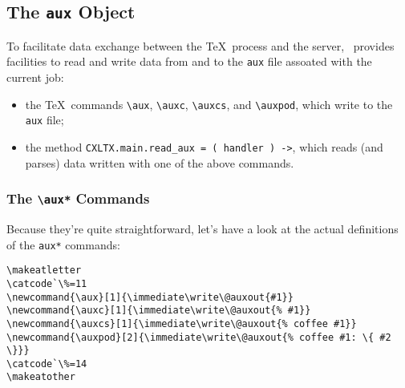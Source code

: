 






\subsection{The \texttt{aux} Object}\label{aux}

To facilitate data exchange between the \TeX\ process and the server, \CXLTX\ provides facilities
to read and write data from and to the \verb#aux# file assoated with the current job:

\begin{itemize}
\item
  the \TeX\ commands \verb#\aux#, \verb#\auxc#, \verb#\auxcs#, and \verb#\auxpod#, which write to the
  \verb#aux# file;
\item
  the method \verb#CXLTX.main.read_aux = ( handler ) ->#, which reads (and parses) data written with one of
  the above commands.
\end{itemize}

\subsubsection{The \texttt{\textbackslash{}aux*} Commands}\label{aux}

Because they're quite straightforward, let's have a look at the actual definitions of the
\verb#aux*# commands:

\begin{verbatim}
\makeatletter
\catcode`\%=11
\newcommand{\aux}[1]{\immediate\write\@auxout{#1}}
\newcommand{\auxc}[1]{\immediate\write\@auxout{% #1}}
\newcommand{\auxcs}[1]{\immediate\write\@auxout{% coffee #1}}
\newcommand{\auxpod}[2]{\immediate\write\@auxout{% coffee #1: \{ #2 \}}}
\catcode`\%=14
\makeatother
\end{verbatim}

